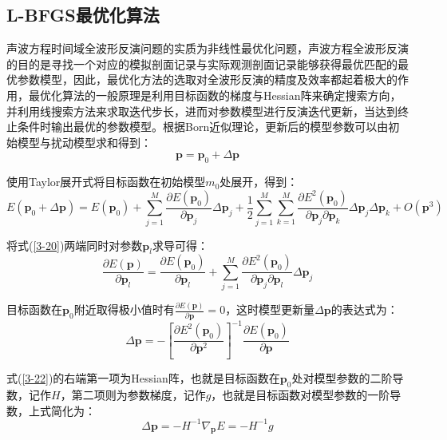 \documentclass[12pt]{article}
\begin{document}
\subsection{L-BFGS最优化算法}
声波方程时间域全波形反演问题的实质为非线性最优化问题，声波方程全波形反演的目的是寻找一个对应的模拟剖面记录与实际观测剖面记录能够获得最优匹配的最优参数模型，因此，最优化方法的选取对全波形反演的精度及效率都起着极大的作用，最优化算法的一般原理是利用目标函数的梯度与Hessian阵来确定搜索方向，并利用线搜索方法来求取迭代步长，进而对参数模型进行反演迭代更新，当达到终止条件时输出最优的参数模型。根据Born近似理论，更新后的模型参数可以由初始模型与扰动模型求和得到：
\begin{equation}\label{3-19}
\boldsymbol{p}=\boldsymbol{p}_0+\Delta \boldsymbol{p}
\end{equation}
\par
使用Taylor展开式将目标函数在初始模型$m_0$处展开，得到：
\begin{equation}\label{3-20}
E(\boldsymbol{p}_0+\Delta \boldsymbol{p})=E(\boldsymbol{p}_0)+\sum_{j=1}^M\frac{\partial E(\boldsymbol{p}_0)}{\partial \boldsymbol{p}_j}\Delta \boldsymbol{p}_j+\frac{1}{2}\sum_{j=1}^M \sum_{k=1}^M\frac{\partial E^2(\boldsymbol{p}_0)}{\partial \boldsymbol{p}_j \partial \boldsymbol{p}_k}\Delta \boldsymbol{p}_j\Delta \boldsymbol{p}_k+O(\boldsymbol{p}^3)
\end{equation}
\par
将式(\ref{3-20})两端同时对参数$\boldsymbol{p}_l$求导可得：
\begin{equation}\label{3-21}
\frac{\partial E(\boldsymbol{p})}{\partial \boldsymbol{p}_l}=\frac{\partial E(\boldsymbol{p}_0)}{\partial \boldsymbol{p}_l}+\sum_{j=1}^M\frac{\partial E^2(\boldsymbol{p}_0)}{\partial \boldsymbol{p}_j \partial \boldsymbol{p}_l}\Delta \boldsymbol{p}_j
\end{equation}
\par
目标函数在$\boldsymbol{p}_0$附近取得极小值时有$\frac{\partial E(\boldsymbol{p})}{\partial \boldsymbol{p}}=0$，这时模型更新量$\Delta \boldsymbol{p}$的表达式为：
\begin{equation}\label{3-22}
\Delta \boldsymbol{p}=-[\frac{\partial E^2(\boldsymbol{p}_0)}{\partial \boldsymbol{p}^2}]^{-1}\frac{\partial E(\boldsymbol{p}_0)}{\partial \boldsymbol{p}}
\end{equation}
\par
式(\ref{3-22})的右端第一项为Hessian阵，也就是目标函数在$\boldsymbol{p}_0$处对模型参数的二阶导数，记作$H$，第二项则为参数梯度，记作$g$，也就是目标函数对模型参数的一阶导数，上式简化为：
\begin{equation}\label{3-23}
\Delta \boldsymbol{p}=-H^{-1}\nabla_{\boldsymbol{p}} E=-H^{-1}g
\end{equation}
\end{document}
